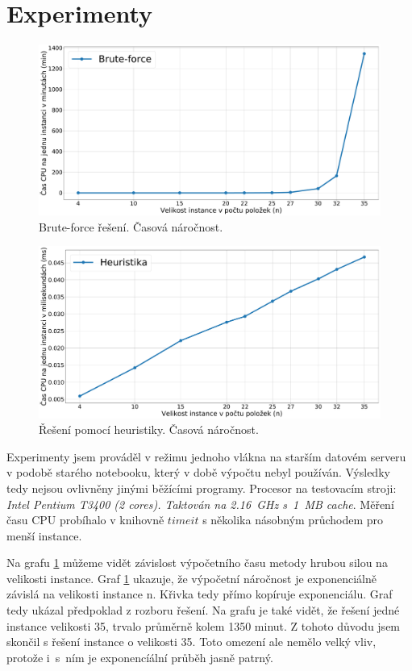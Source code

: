 \documentclass[11pt]{article}
\begin{document}
\section{Experimenty}
\begin{figure}\centering
	\includegraphics[scale=0.25]{img/1}
 	\caption[1]{Brute-force řešení. Časová náročnost.}\label{fig:1}
 \end{figure} 	
 \begin{figure}\centering
	\includegraphics[scale=0.25]{img/2}
 	\caption[2]{Řešení pomocí heuristiky. Časová náročnost.}\label{fig:2}
 \end{figure} 	
 
Experimenty jsem prováděl v režimu jednoho vlákna na starším datovém serveru v podobě starého notebooku, který v době výpočtu nebyl používán. Výsledky tedy nejsou ovlivněny jinými běžícími programy. Procesor na testovacím stroji: \textit{Intel Pentium T3400 (2 cores). Taktován na 2.16~GHz s~1~MB cache}.
Měření času CPU probíhalo v knihovně $timeit$ s několika násobným průchodem pro menší instance.

Na grafu \ref{fig:1} můžeme vidět závislost výpočetního času metody hrubou silou na velikosti instance. Graf \ref{fig:1} ukazuje, že výpočetní náročnost je exponenciálně závislá na velikosti instance n. Křivka tedy přímo kopíruje exponenciálu. Graf tedy ukázal předpoklad z rozboru řešení. Na grafu je také vidět, že řešení jedné instance velikosti 35, trvalo průměrně kolem 1350 minut. Z tohoto důvodu jsem skončil s řešení instance o velikosti 35. Toto omezení ale nemělo velký vliv, protože i~s~ním je exponencíální průběh jasně patrný.
\end{document}
